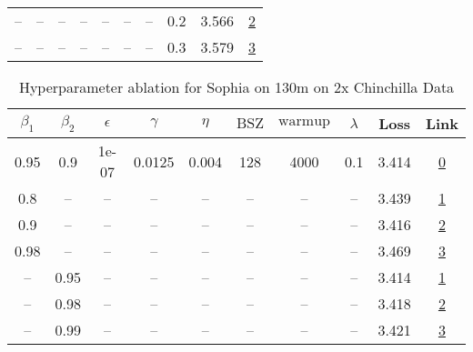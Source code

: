 \begin{table}[H]
\begin{tabular}{cccccccccc}
-- & -- & -- & -- & -- & -- & -- & 0.2 & 3.566 & \href{https://wandb.ai/stanford-mercury/optimizer-scaling/runs/sweep-130m-2B-sophiag262a51lr0.004-wd0.2-minlr0-warmup4000-b10.9-508c87}{2} \\
-- & -- & -- & -- & -- & -- & -- & 0.3 & 3.579 & \href{https://wandb.ai/stanford-mercury/optimizer-scaling/runs/sweep-130m-2B-sophiag140385lr0.004-wd0.3-minlr0-warmup4000-b10.9-843326}{3} \\
\bottomrule
\end{tabular}
\end{table}

\begin{table}[H]
\centering
\caption{Hyperparameter ablation for Sophia on 130m on 2x Chinchilla Data}
\label{tab:ablation_sophia_130m_on_2x_chinchilla_data}
\begin{tabular}{cccccccccc}
\toprule
$\beta_1$ & $\beta_2$ & $\epsilon$ & $\gamma$ & $\eta$ & $\mathrm{BSZ}$ & $\mathrm{warmup}$ & $\lambda$ & Loss & Link \\
\midrule
0.95 & 0.9 & 1e-07 & 0.0125 & 0.004 & 128 & 4000 & 0.1 & 3.414 & \href{https://wandb.ai/stanford-mercury/optimizer-scaling/runs/sweep-130m-5B-sophiaf95b3dlr0.004-wd0.1-minlr0-warmup4000-b10.95-187352}{0} \\
\midrule
0.8 & -- & -- & -- & -- & -- & -- & -- & 3.439 & \href{https://wandb.ai/stanford-mercury/optimizer-scaling/runs/sweep-130m-5B-sophia282c09lr0.004-wd0.1-minlr0-warmup4000-b10.8--b60356}{1} \\
0.9 & -- & -- & -- & -- & -- & -- & -- & 3.416 & \href{https://wandb.ai/stanford-mercury/optimizer-scaling/runs/sweep-130m-5B-sophiae5887flr0.004-wd0.1-minlr0-warmup4000-b10.9--0010c1}{2} \\
0.98 & -- & -- & -- & -- & -- & -- & -- & 3.469 & \href{https://wandb.ai/stanford-mercury/optimizer-scaling/runs/sweep-130m-5B-sophiad61acalr0.004-wd0.1-minlr0-warmup4000-b10.98-0311d7}{3} \\
-- & 0.95 & -- & -- & -- & -- & -- & -- & 3.414 & \href{https://wandb.ai/stanford-mercury/optimizer-scaling/runs/sweep-130m-5B-sophia27d93clr0.004-wd0.1-minlr0-warmup4000-b10.95-0c4238}{1} \\
-- & 0.98 & -- & -- & -- & -- & -- & -- & 3.418 & \href{https://wandb.ai/stanford-mercury/optimizer-scaling/runs/sweep-130m-5B-sophiad1cb34lr0.004-wd0.1-minlr0-warmup4000-b10.95-298f3a}{2} \\
-- & 0.99 & -- & -- & -- & -- & -- & -- & 3.421 & \href{https://wandb.ai/stanford-mercury/optimizer-scaling/runs/sweep-130m-5B-sophia7b63b9lr0.004-wd0.1-minlr0-warmup4000-b10.95-48c5c4}{3} \\

\end{tabular}
\end{table}
